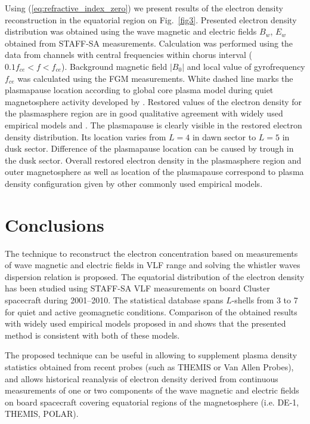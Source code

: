 \documentclass[a4paper]{article}
\begin{document}
Using (\ref{eq:refractive_index_zero}) we present results of the electron density reconstruction in the equatorial region on Fig.~\ref{fig3}. Presented electron density distribution was obtained using the wave magnetic and electric fields $B_w$, $E_w$ obtained from STAFF-SA measurements. Calculation was performed using the data from channels with central frequencies within chorus interval ($0.1f_{ce} < f < f_{ce}$). Background magnetic field $|B_0|$ and local value of gyrofrequency $f_{ce}$ was calculated using the FGM measurements. White dashed line marks the plasmapause location according to global core plasma model during quiet magnetosphere activity developed by \citet{gallagher2000global}. Restored values of the electron density for the plasmasphere region are in good qualitative agreement with widely used empirical models \citep{ozhogin2012field} and \citep{sheeley2001empirical}. The plasmapause is clearly visible in the restored electron density distribution. Its location varies from $L = 4$ in dawn sector to $L = 5$ in dusk sector. Difference of the plasmapause location can be caused by trough in the dusk sector. Overall restored electron density in the plasmasphere region and outer magnetosphere as well as location of the plasmapause correspond to plasma density configuration given by other commonly used empirical models.

\section*{\sc Conclusions}
\indent \indent The technique to reconstruct the electron concentration based on measurements of wave magnetic and electric fields in VLF range and solving the whistler waves dispersion relation is proposed. The equatorial distribution of the electron density has been studied using STAFF-SA VLF measurements on board Cluster spacecraft during 2001--2010. The statistical database spans $L$-shells from 3 to 7 for quiet and active geomagnetic conditions. Comparison of the obtained results with widely used empirical models proposed in \citep{ozhogin2012field} and \citep{sheeley2001empirical} shows that the presented method is consistent with both of these models.

The proposed technique can be useful in allowing to supplement plasma density statistics obtained from recent probes (such as THEMIS or Van Allen Probes), and allows historical reanalysis of electron density derived from continuous measurements of one or two components of the wave magnetic and electric fields on board spacecraft covering equatorial regions of the magnetosphere (i.e. DE-1, THEMIS, POLAR).
\end{document}

